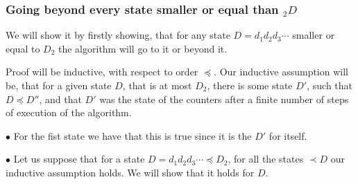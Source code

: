 \subsubsection{Going beyond every state smaller or equal than $_2D$}\label{going beyond}
We will show it by firstly showing, that for any state $D = d_1d_2d_3\cdots$ smaller 
or equal to  
$D_2$ the algorithm will go to it or beyond it.

Proof will be inductive, with respect to order $\preceq$. Our inductive assumption will be, that 
for a given state $D$, that is at most $D_2$, 
there is some state $D'$, such 
that $D\preceq D''$, and that $D'$ was the state of the counters after a finite 
number of steps of execution of the algorithm. 

$\bullet$ For the fist state we have that this is true since it is the $D'$ for itself.

$\bullet$ Let us suppose that for a state $D = d_1d_2d_3\cdots \preceq D_2$, for  
all the states $\prec D$ our inductive assumption holds. We will show that it holds 
for $D$. 
 
